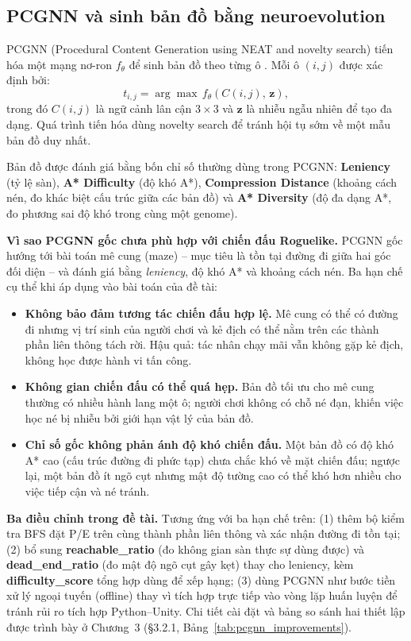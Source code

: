\subsection{PCGNN và sinh bản đồ bằng neuroevolution}

PCGNN (Procedural Content Generation using NEAT and novelty search) tiến hóa một mạng nơ-ron $f_\theta$ để sinh bản đồ theo từng ô \cite{Beukman2022}. Mỗi ô $(i,j)$ được xác định bởi:
\begin{equation}
    t_{i,j} = \arg\max\, f_\theta(C(i,j),\, \mathbf{z}),
\end{equation}
trong đó $C(i,j)$ là ngữ cảnh lân cận $3\times3$ và $\mathbf{z}$ là nhiễu ngẫu nhiên để tạo đa dạng. Quá trình tiến hóa dùng novelty search để tránh hội tụ sớm về một mẫu bản đồ duy nhất.

Bản đồ được đánh giá bằng bốn chỉ số thường dùng trong PCGNN: \textbf{Leniency} (tỷ lệ sàn), \textbf{A* Difficulty} (độ khó A*), \textbf{Compression Distance} (khoảng cách nén, đo khác biệt cấu trúc giữa các bản đồ) và \textbf{A* Diversity} (độ đa dạng A*, đo phương sai độ khó trong cùng một genome).

\textbf{Vì sao PCGNN gốc chưa phù hợp với chiến đấu Roguelike.} PCGNN gốc hướng tới bài toán mê cung (maze) -- mục tiêu là tồn tại đường đi giữa hai góc đối diện -- và đánh giá bằng \emph{leniency}, độ khó A* và khoảng cách nén. Ba hạn chế cụ thể khi áp dụng vào bài toán của đề tài:
\begin{itemize}
    \item \textbf{Không bảo đảm tương tác chiến đấu hợp lệ.} Mê cung có thể có đường đi nhưng vị trí sinh của người chơi và kẻ địch có thể nằm trên các thành phần liên thông tách rời. Hậu quả: tác nhân chạy mãi vẫn không gặp kẻ địch, không học được hành vi tấn công.
    \item \textbf{Không gian chiến đấu có thể quá hẹp.} Bản đồ tối ưu cho mê cung thường có nhiều hành lang một ô; người chơi không có chỗ né đạn, khiến việc học né bị nhiễu bởi giới hạn vật lý của bản đồ.
    \item \textbf{Chỉ số gốc không phản ánh độ khó chiến đấu.} Một bản đồ có độ khó A* cao (cấu trúc đường đi phức tạp) chưa chắc khó về mặt chiến đấu; ngược lại, một bản đồ ít ngõ cụt nhưng mật độ tường cao có thể khó hơn nhiều cho việc tiếp cận và né tránh.
\end{itemize}

\textbf{Ba điều chỉnh trong đề tài.} Tương ứng với ba hạn chế trên: (1) thêm bộ kiểm tra BFS đặt P/E trên cùng thành phần liên thông và xác nhận đường đi tồn tại; (2) bổ sung \textbf{reachable\_ratio} (đo không gian sàn thực sự dùng được) và \textbf{dead\_end\_ratio} (đo mật độ ngõ cụt gây kẹt) thay cho leniency, kèm \textbf{difficulty\_score} tổng hợp dùng để xếp hạng; (3) dùng PCGNN như bước tiền xử lý ngoại tuyến (offline) thay vì tích hợp trực tiếp vào vòng lặp huấn luyện để tránh rủi ro tích hợp Python--Unity. Chi tiết cài đặt và bảng so sánh hai thiết lập được trình bày ở Chương~3 (§3.2.1, Bảng~\ref{tab:pcgnn_improvements}).

